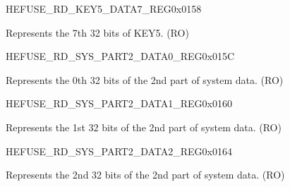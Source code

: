 \begin{register}{H}{EFUSE\_RD\_KEY5\_DATA7\_REG}{0x0158}\label{regdesc:EFUSERDKEY5DATA7REG}
%
\regnewline%
\begin{regdesc}\begin{reglist}
\label{fielddesc:EFUSEKEY5DATA7}\item [EFUSE\_KEY5\_DATA7] Represents the 7th 32 bits of KEY5. (RO)
\end{reglist}\end{regdesc}
\end{register}


\begin{register}{H}{EFUSE\_RD\_SYS\_PART2\_DATA0\_REG}{0x015C}\label{regdesc:EFUSERDSYSPART2DATA0REG}
%
\regnewline%
\begin{regdesc}\begin{reglist}
\label{fielddesc:EFUSESYSDATAPART20}\item [EFUSE\_SYS\_DATA\_PART2\_0] Represents the 0th 32 bits of the 2nd part of system data. (RO)
\end{reglist}\end{regdesc}
\end{register}


\begin{register}{H}{EFUSE\_RD\_SYS\_PART2\_DATA1\_REG}{0x0160}\label{regdesc:EFUSERDSYSPART2DATA1REG}
%
\regnewline%
\begin{regdesc}\begin{reglist}
\label{fielddesc:EFUSESYSDATAPART21}\item [EFUSE\_SYS\_DATA\_PART2\_1] Represents the 1st 32 bits of the 2nd part of system data. (RO)
\end{reglist}\end{regdesc}
\end{register}


\begin{register}{H}{EFUSE\_RD\_SYS\_PART2\_DATA2\_REG}{0x0164}\label{regdesc:EFUSERDSYSPART2DATA2REG}
%
\regnewline%
\begin{regdesc}\begin{reglist}
\label{fielddesc:EFUSESYSDATAPART22}\item [EFUSE\_SYS\_DATA\_PART2\_2] Represents the 2nd 32 bits of the 2nd part of system data. (RO)
\end{reglist}\end{regdesc}
\end{register}


